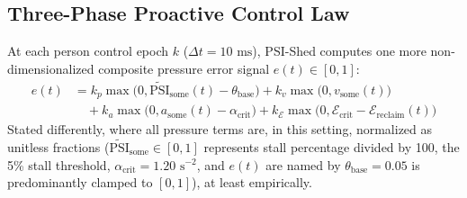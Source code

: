 \documentclass[pdflatex,sn-mathphys,Numbered]{sn-jnl}
\begin{document}
\subsection{Three-Phase Proactive Control Law}
At each person control epoch $k$ ($\Delta t = 10\text{ ms}$), PSI-Shed computes one more non-dimensionalized composite pressure error signal $e(t) \in [0, 1]$:
\begin{equation}
\begin{aligned}
e(t) &= k_p \max\big(0, \tilde{\text{PSI}}_{\text{some}}(t) - \theta_{\text{base}}\big) + k_v \max\big(0, v_{\text{some}}(t)\big) \\
&\quad + k_a \max\big(0, a_{\text{some}}(t) - \alpha_{\text{crit}}\big) + k_{\mathcal{E}} \max\big(0, \mathcal{E}_{\text{crit}} - \mathcal{E}_{\text{reclaim}}(t)\big)
\end{aligned}
\label{eq:composite_error}
\end{equation}
Stated differently, where all pressure terms are, in this setting, normalized as unitless fractions ($\tilde{\text{PSI}}_{\text{some}} \in [0, 1]$ represents stall percentage divided by 100, the 5\% stall threshold, $\alpha_{\text{crit}} = 1.20\text{ s}^{-2}$, and $e(t)$ are named by $\theta_{\text{base}} = 0.05$ is predominantly clamped to $[0, 1]$), at least empirically.
\end{document}
